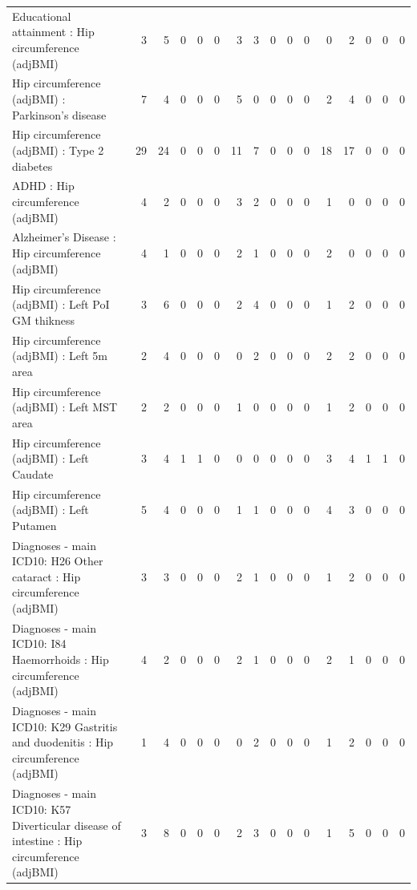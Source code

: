 \begin{table}[ht]
\begin{tabular}{lrrrrrrrrrrrrrrr}
  Educational attainment : Hip circumference (adjBMI) &   3 &   5 &   0 &   0 &   0 &   3 &   3 &   0 &   0 &   0 &   0 &   2 &   0 &   0 &   0 \\ 
  Hip circumference (adjBMI) : Parkinson's disease &   7 &   4 &   0 &   0 &   0 &   5 &   0 &   0 &   0 &   0 &   2 &   4 &   0 &   0 &   0 \\ 
  Hip circumference (adjBMI) : Type 2 diabetes &  29 &  24 &   0 &   0 &   0 &  11 &   7 &   0 &   0 &   0 &  18 &  17 &   0 &   0 &   0 \\ 
  ADHD : Hip circumference (adjBMI) &   4 &   2 &   0 &   0 &   0 &   3 &   2 &   0 &   0 &   0 &   1 &   0 &   0 &   0 &   0 \\ 
  Alzheimer's Disease : Hip circumference (adjBMI) &   4 &   1 &   0 &   0 &   0 &   2 &   1 &   0 &   0 &   0 &   2 &   0 &   0 &   0 &   0 \\ 
  Hip circumference (adjBMI) : Left PoI GM thikness &   3 &   6 &   0 &   0 &   0 &   2 &   4 &   0 &   0 &   0 &   1 &   2 &   0 &   0 &   0 \\ 
  Hip circumference (adjBMI) : Left 5m area &   2 &   4 &   0 &   0 &   0 &   0 &   2 &   0 &   0 &   0 &   2 &   2 &   0 &   0 &   0 \\ 
  Hip circumference (adjBMI) : Left MST area &   2 &   2 &   0 &   0 &   0 &   1 &   0 &   0 &   0 &   0 &   1 &   2 &   0 &   0 &   0 \\ 
  Hip circumference (adjBMI) : Left Caudate &   3 &   4 &   1 &   1 &   0 &   0 &   0 &   0 &   0 &   0 &   3 &   4 &   1 &   1 &   0 \\ 
  Hip circumference (adjBMI) : Left Putamen &   5 &   4 &   0 &   0 &   0 &   1 &   1 &   0 &   0 &   0 &   4 &   3 &   0 &   0 &   0 \\ 
  Diagnoses - main ICD10: H26 Other cataract : Hip circumference (adjBMI) &   3 &   3 &   0 &   0 &   0 &   2 &   1 &   0 &   0 &   0 &   1 &   2 &   0 &   0 &   0 \\ 
  Diagnoses - main ICD10: I84 Haemorrhoids : Hip circumference (adjBMI) &   4 &   2 &   0 &   0 &   0 &   2 &   1 &   0 &   0 &   0 &   2 &   1 &   0 &   0 &   0 \\ 
  Diagnoses - main ICD10: K29 Gastritis and duodenitis : Hip circumference (adjBMI) &   1 &   4 &   0 &   0 &   0 &   0 &   2 &   0 &   0 &   0 &   1 &   2 &   0 &   0 &   0 \\ 
  Diagnoses - main ICD10: K57 Diverticular disease of intestine : Hip circumference (adjBMI) &   3 &   8 &   0 &   0 &   0 &   2 &   3 &   0 &   0 &   0 &   1 &   5 &   0 &   0 &   0 \\ 

\end{tabular}
\end{table}
